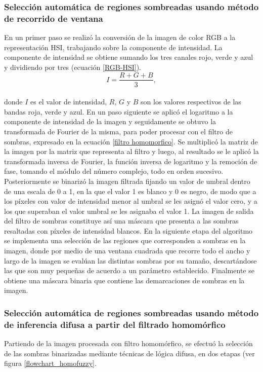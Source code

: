\subsubsection{Selección automática de regiones sombreadas usando método de recorrido de ventana} \label{metod_homo_ventana}
En un primer paso se realizó la conversión de la imagen de color RGB a la representación HSI, trabajando sobre la componente de intensidad. La componente de intensidad se obtiene sumando los tres canales rojo, verde y azul y dividiendo por tres (ecuación \ref{RGB-HSI}). 
\\
\begin{equation}
	I=\frac{R+G+B}{3},\label{RGB-HSI}
\end{equation}
\\
donde $I$ es el valor de intensidad, $R$, $G$ y $B$ son los valores respectivos de las bandas roja, verde y azul.
En un paso siguiente se aplicó el logaritmo a la componente de intensidad de la imagen y seguidamente se obtuvo la transformada de Fourier de la misma, para poder procesar con el filtro de sombras, expresado en la ecuación \ref{filtro homomorfico}. Se multiplicó la matriz de la imagen por la matriz que representa al filtro y luego, al resultado se le aplicó la transformada inversa de Fourier, la función inversa de logaritmo y la remoción de fase, tomando el módulo del número complejo, todo en orden sucesivo. 
Posteriormente se binarizó la imagen filtrada fijando un valor de umbral dentro de una escala de 0 a 1, en la que el valor 1 es blanco y 0 es negro, de modo que a los píxeles con valor de intensidad menor al umbral se les asignó el valor cero, y a los que superaban el valor umbral se les asignaba el valor 1. La imagen de salida del filtro de sombras constituye así una máscara que presenta a las sombras resaltadas con píxeles de intensidad blancos. En la siguiente etapa del algoritmo se implementa una selección de las regiones que corresponden a sombras en la imagen, donde por medio de una ventana cuadrada que recorre todo el ancho y largo de la imagen se evalúan las distintas sombras por su tamaño, descartándose las que son muy pequeñas de acuerdo a un parámetro establecido. Finalmente se obtiene una máscara binaria que contiene las demarcaciones de sombras en la imagen.

\subsubsection{Selección automática de regiones sombreadas usando método de inferencia difusa a partir del filtrado homomórfico} \label{metod_homo_fuzzy}
Partiendo de la imagen procesada con filtro homomórfico, se efectuó la selección de las sombras binarizadas mediante técnicas de lógica difusa, en dos etapas (ver figura \ref{flowchart_homofuzzy}. \\

